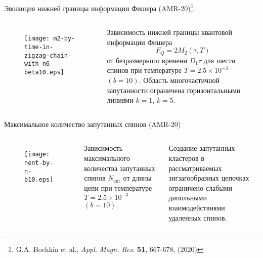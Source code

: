 \begin{frame}{Эволюция нижней границы информации Фишера (AMR-20)\footnote{G.A. Bochkin et al., \textit{Appl. Magn. Res.} \textbf{51}, 667-678, (2020)}}
\begin{columns}

    \begin{figure}
    \texttt{[image: m2-by-time-in-zigzag-chain-with-n6-beta10.eps]}
    \end{figure}

    Зависимость нижней границы квантовой информации Фишера
    $$ F_Q = 2M_2(\tau, T) $$
    от безразмерного времени $D_1 \tau$
    для шести спинов
    при температуре $T = 2.5 \times 10^{-3}$ $(b = 10)$.
    Область многочастичной запутанности ограничена горизонтальными линиями $k = 1$, $k = 5$.
\end{columns}
\end{frame}


\begin{frame}{Максимальное количество запутанных спинов (AMR-20)}
\begin{columns}

    \begin{figure}
    \texttt{[image: nent-by-n-b10.eps]}
    \end{figure}

    Зависимость максимального количества запутанных спинов $N_\mathrm{ent}$ от длины цепи при температуре $T = 2.5 \times 10^{-3}$ $(b = 10)$.

    \vspace{0.5cm}

    \alert{Создание запутанных кластеров в рассматриваемых зигзагообразных цепочках ограничено слабыми дипольными взаимодействиями удаленных спинов}.
\end{columns}
\end{frame}


